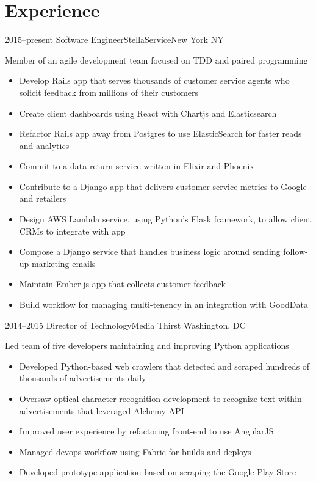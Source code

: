 \documentclass[10pt,a4paper,merriweather]{moderncv}        %
\begin{document}
\makecvtitle
\vspace{-1.5cm}

\section{Experience}

\cventry
{2015--present}
{Software Engineer}{StellaService}{New York NY}{}
{Member of an agile development team focused on TDD and paired programming
\begin{itemize}
\item Develop Rails app that serves thousands of customer service agents who solicit feedback from millions of their customers
\item Create client dashboards using React with Chartjs and Elasticsearch
\item Refactor Rails app away from Postgres to use ElasticSearch for faster reads and analytics
\item Commit to a data return service written in Elixir and Phoenix
\item Contribute to a Django app that delivers customer service metrics to Google and retailers
\item Design AWS Lambda service, using Python's Flask framework, to allow client CRMs to integrate with app
\item Compose a Django service that handles business logic around sending follow-up marketing emails
\item Maintain Ember.js app that collects customer feedback
\item Build workflow for managing multi-tenency in an integration with GoodData
\end{itemize}}

\cventry
{2014--2015}
{Director of Technology}{Media Thirst }{Washington, DC}{}
{Led team of five developers maintaining and improving Python applications
\begin{itemize}
\item Developed Python-based web crawlers that detected and scraped hundreds of thousands of advertisements daily
\item Oversaw optical character recognition development to recognize text within advertisements that leveraged Alchemy API
\item Improved user experience by refactoring front-end to use AngularJS
\item Managed devops workflow using Fabric for builds and deploys
\item Developed prototype application based on scraping the Google Play Store
\end{itemize}}
\vspace{.15cm}
\end{document}
